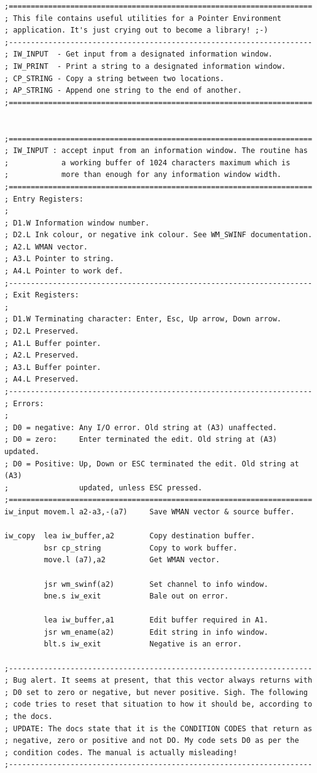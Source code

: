 \begin{lstlisting}[firstnumber=1,]
;=====================================================================
; This file contains useful utilities for a Pointer Environment
; application. It's just crying out to become a library! ;-)
;---------------------------------------------------------------------
; IW_INPUT  - Get input from a designated information window.
; IW_PRINT  - Print a string to a designated information window.
; CP_STRING - Copy a string between two locations.
; AP_STRING - Append one string to the end of another.
;=====================================================================


;=====================================================================
; IW_INPUT : accept input from an information window. The routine has
;            a working buffer of 1024 characters maximum which is
;            more than enough for any information window width.
;=====================================================================
; Entry Registers:
;
; D1.W Information window number.
; D2.L Ink colour, or negative ink colour. See WM_SWINF documentation.
; A2.L WMAN vector.
; A3.L Pointer to string.
; A4.L Pointer to work def.
;---------------------------------------------------------------------
; Exit Registers:
;
; D1.W Terminating character: Enter, Esc, Up arrow, Down arrow.
; D2.L Preserved.
; A1.L Buffer pointer.
; A2.L Preserved.
; A3.L Buffer pointer.
; A4.L Preserved.
;---------------------------------------------------------------------
; Errors:
;
; D0 = negative: Any I/O error. Old string at (A3) unaffected.
; D0 = zero:     Enter terminated the edit. Old string at (A3) updated.
; D0 = Positive: Up, Down or ESC terminated the edit. Old string at (A3)
;                updated, unless ESC pressed.
;=====================================================================
iw_input movem.l a2-a3,-(a7)     Save WMAN vector & source buffer.

iw_copy  lea iw_buffer,a2        Copy destination buffer.
         bsr cp_string           Copy to work buffer.
         move.l (a7),a2          Get WMAN vector.

         jsr wm_swinf(a2)        Set channel to info window.
         bne.s iw_exit           Bale out on error.

         lea iw_buffer,a1        Edit buffer required in A1.
         jsr wm_ename(a2)        Edit string in info window.
         blt.s iw_exit           Negative is an error.

;---------------------------------------------------------------------
; Bug alert. It seems at present, that this vector always returns with
; D0 set to zero or negative, but never positive. Sigh. The following
; code tries to reset that situation to how it should be, according to
; the docs.
; UPDATE: The docs state that it is the CONDITION CODES that return as
; negative, zero or positive and not DO. My code sets D0 as per the 
; condition codes. The manual is actually misleading!
;---------------------------------------------------------------------


\end{lstlisting}

